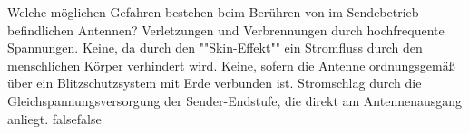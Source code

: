     {Welche möglichen Gefahren bestehen beim Berühren von im Sendebetrieb befindlichen Antennen?}
    {Verletzungen und Verbrennungen durch hochfrequente Spannungen.}
    {Keine, da durch den ""Skin-Effekt"" ein Stromfluss durch den menschlichen Körper verhindert wird.}
    {Keine, sofern die Antenne ordnungsgemäß über ein Blitzschutzsystem mit Erde verbunden ist.}
    {Stromschlag durch die Gleichspannungsversorgung der Sender-Endstufe, die direkt am Antennenausgang anliegt.}
    {false}{false}